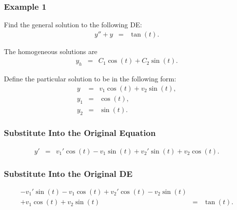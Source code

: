 \begin{frame}
  \frametitle{Example 1}
  Find the general solution to the following DE:
  \begin{eqnarray*}
    y'' + y & = & \tan(t).
  \end{eqnarray*}

  {
    The homogeneous solutions are
    \begin{eqnarray*}
      y_h & = & C_1 \cos(t) + C_2 \sin(t).
    \end{eqnarray*}
  }

  {
    Define the particular solution to be in the following form:
    \begin{eqnarray*}
      y & = & v_1 \cos(t) + v_2 \sin(t), \\
      y_1 & = & \cos(t), \\
      y_2 & = & \sin(t).
    \end{eqnarray*}
  }

\end{frame}

\begin{frame}
  \frametitle{Substitute Into the Original Equation}

  \begin{eqnarray*}
    y' & = & v_1' \cos(t) - v_1 \sin(t) + v_2' \sin(t) + v_2 \cos(t).
  \end{eqnarray*}




\end{frame}

\begin{frame}
  \frametitle{Substitute Into the Original DE}

  \begin{eqnarray*}
    - v_1' \sin(t) - v_1 \cos(t) + v_2' \cos(t) - v_2 \sin(t) & & \\
    + v_1 \cos(t) + v_2 \sin(t) & = & \tan(t).
  \end{eqnarray*}


\end{frame}

